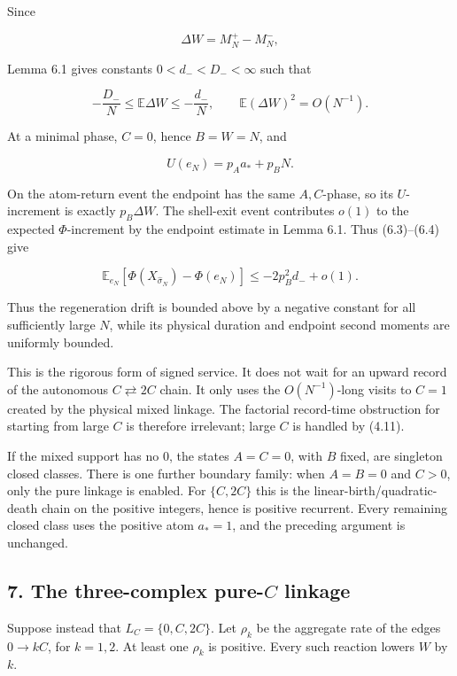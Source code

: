 Since

\[
 \Delta W=M_N^+-M_N^-,
\]

Lemma 6.1 gives constants \(0<d_-<D_-<\infty\) such that

\[
 -\frac{D_-}{N}\le \mathbb E\Delta W
 \le-\frac{d_-}{N},
\qquad
 \mathbb E(\Delta W)^2=O(N^{-1}).
\tag{6.4}
\]

At a minimal phase, \(C=0\), hence \(B=W=N\), and

\[
 U(e_N)=p_Aa_*+p_BN.
\tag{6.5}
\]

On the atom-return event the endpoint has the same \(A,C\)-phase, so its
\(U\)-increment is exactly \(p_B\Delta W\). The shell-exit event
contributes \(o(1)\) to the expected \(\Phi\)-increment by the endpoint
estimate in Lemma 6.1. Thus (6.3)--(6.4) give

\[
 \mathbb E_{e_N}[\Phi(X_{\widehat\sigma_N})-\Phi(e_N)]
 \le-2p_B^2d_-+o(1).
\tag{6.6}
\]

Thus the regeneration drift is bounded above by a negative constant for
all sufficiently large \(N\), while its physical duration and endpoint
second moments are uniformly bounded.

This is the rigorous form of signed service. It does not wait for an
upward record of the autonomous \(C\rightleftarrows2C\) chain. It only
uses the \(O(N^{-1})\)-long visits to \(C=1\) created by the physical
mixed linkage. The factorial record-time obstruction for starting from
large \(C\) is therefore irrelevant; large \(C\) is handled by (4.11).

If the mixed support has no \(0\), the states \(A=C=0\), with \(B\)
fixed, are singleton closed classes. There is one further boundary
family: when \(A=B=0\) and \(C>0\), only the pure linkage is enabled.
For \(\{C,2C\}\) this is the linear-birth/quadratic-death chain on the
positive integers, hence is positive recurrent. Every remaining closed
class uses the positive atom \(a_*=1\), and the preceding argument is
unchanged.

\subsection{\texorpdfstring{7. The three-complex pure-\(C\)
linkage}{7. The three-complex pure-C linkage}}

Suppose instead that \(L_C=\{0,C,2C\}\). Let \(\rho_k\) be the aggregate
rate of the edges \(0\to kC\), for \(k=1,2\). At least one \(\rho_k\) is
positive. Every such reaction lowers \(W\) by \(k\).

